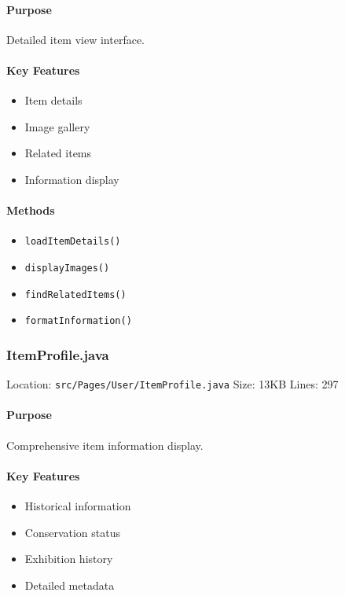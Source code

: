\documentclass[12pt,a4paper]{article}
\begin{document}
\paragraph{Purpose}
Detailed item view interface.

\paragraph{Key Features}
\begin{itemize}
    \item Item details
    \item Image gallery
    \item Related items
    \item Information display
\end{itemize}

\paragraph{Methods}
\begin{itemize}
    \item \texttt{loadItemDetails()}
    \item \texttt{displayImages()}
    \item \texttt{findRelatedItems()}
    \item \texttt{formatInformation()}
\end{itemize}

\subsubsection{ItemProfile.java}
Location: \texttt{src/Pages/User/ItemProfile.java}
Size: 13KB
Lines: 297

\paragraph{Purpose}
Comprehensive item information display.

\paragraph{Key Features}
\begin{itemize}
    \item Historical information
    \item Conservation status
    \item Exhibition history
    \item Detailed metadata
\end{itemize}
\end{document}
